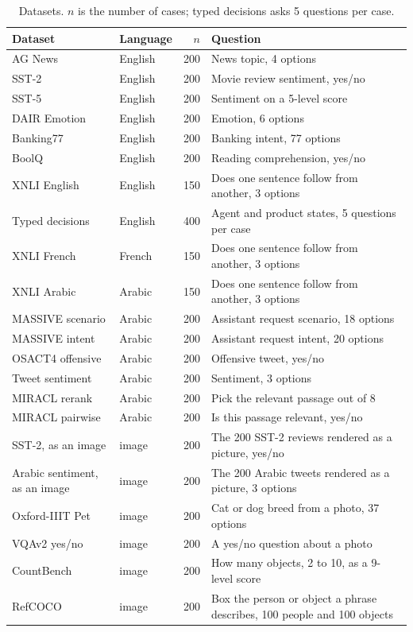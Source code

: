 \begin{table}[t]\centering\small
\caption{Datasets. $n$ is the number of cases; typed decisions asks 5 questions per case.}\label{tab:data}
\begin{tabular}{llrp{8cm}}\toprule Dataset & Language & $n$ & Question \\ \midrule
AG News & English & 200 & News topic, 4 options \\
SST-2 & English & 200 & Movie review sentiment, yes/no \\
SST-5 & English & 200 & Sentiment on a 5-level score \\
DAIR Emotion & English & 200 & Emotion, 6 options \\
Banking77 & English & 200 & Banking intent, 77 options \\
BoolQ & English & 200 & Reading comprehension, yes/no \\
XNLI English & English & 150 & Does one sentence follow from another, 3 options \\
Typed decisions & English & 400 & Agent and product states, 5 questions per case \\
XNLI French & French & 150 & Does one sentence follow from another, 3 options \\
XNLI Arabic & Arabic & 150 & Does one sentence follow from another, 3 options \\
MASSIVE scenario & Arabic & 200 & Assistant request scenario, 18 options \\
MASSIVE intent & Arabic & 200 & Assistant request intent, 20 options \\
OSACT4 offensive & Arabic & 200 & Offensive tweet, yes/no \\
Tweet sentiment & Arabic & 200 & Sentiment, 3 options \\
MIRACL rerank & Arabic & 200 & Pick the relevant passage out of 8 \\
MIRACL pairwise & Arabic & 200 & Is this passage relevant, yes/no \\
\midrule
SST-2, as an image & image & 200 & The 200 SST-2 reviews rendered as a picture, yes/no \\
Arabic sentiment, as an image & image & 200 & The 200 Arabic tweets rendered as a picture, 3 options \\
Oxford-IIIT Pet & image & 200 & Cat or dog breed from a photo, 37 options \\
VQAv2 yes/no & image & 200 & A yes/no question about a photo \\
CountBench & image & 200 & How many objects, 2 to 10, as a 9-level score \\
RefCOCO & image & 200 & Box the person or object a phrase describes, 100 people and 100 objects \\
\bottomrule\end{tabular}\end{table}

